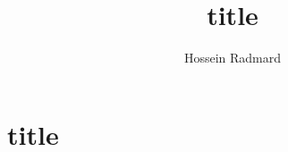 \documentclass{book}
\begin{document}
\title{title}
\author{Hossein Radmard}
\maketitle
\chapter{title}
\end{document}
